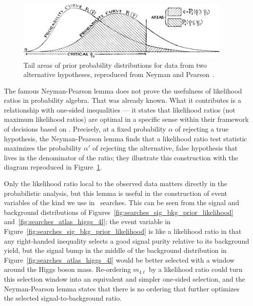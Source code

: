 \begin{figure}[tp]
\centering
\includegraphics[width=0.95\textwidth]{figures/searches_np_curves_crop.png}
\caption[
Tail areas of prior probability distributions for data from two alternative
hypotheses, reproduced from Neyman and Pearson
]{%
Tail areas of prior probability distributions for data from two alternative
hypotheses, reproduced from Neyman and Pearson~\cite{neymanpearson1933lemma}.
}
\label{fig:searches_np_tails}
\end{figure}

The famous Neyman-Pearson lemma does not prove the usefulness of likelihood
ratios in probability algebra.
That was already known.
What it contributes is a relationship with one-sided inequalities ---
it states that likelihood ratios (not maximum likelihood ratios)
are optimal in a specific sense within their framework of decisions
based on \pvalues.
Precisely, at a fixed probability $\alpha$ of rejecting a true hypothesis,
the Neyman-Pearson lemma finds that a likelihood ratio test statistic maximizes
the probability $\alpha'$ of rejecting the alternative, false hypothesis that
lives in the denominator of the ratio; they illustrate this construction with
the diagram reproduced in Figure~\ref{fig:searches_np_tails}.

Only the likelihood ratio local to the observed data matters directly in the
probabilistic analysis, but this lemma is useful in the construction
of event variables of the kind we use in \atlas\ searches.
This can be seen from the signal and background distributions of
Figures~\ref{fig:searches_sig_bkg_prior_likelihood}
and~\ref{fig:searches_atlas_higgs_4l};
the event variable in Figure~\ref{fig:searches_sig_bkg_prior_likelihood} is
like a likelihood ratio in that any right-handed inequality selects a good
signal purity relative to its background yield, but the signal bump in the
middle of the background distribution in
Figure~\ref{fig:searches_atlas_higgs_4l} would be better selected with a
window around the Higgs boson mass.
Re-ordering $m_{4\ell}$ by a likelihood ratio could turn this selection window
into an equivalent and simpler one-sided selection, and the Neyman-Pearson
lemma states that there is no ordering that further optimizes the selected
signal-to-background ratio.

